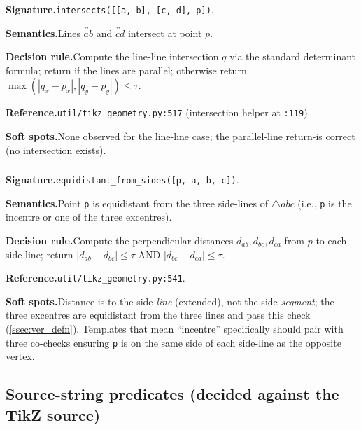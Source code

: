 \subsubsection{}
\label{app:pred:intersects}

\noindent\textbf{Signature.}\quad \texttt{intersects([[a, b], [c, d], p])}.

\noindent\textbf{Semantics.}\quad Lines $\overleftrightarrow{ab}$ and $\overleftrightarrow{cd}$ intersect at point $p$.

\noindent\textbf{Decision rule.}\quad Compute the line-line intersection $q$ via the standard determinant formula; return \false if the lines are parallel; otherwise return $\max(|q_x - p_x|, |q_y - p_y|) \leq \tau$.

\noindent\textbf{Reference.}\quad \texttt{util/tikz\_geometry.py:517} (intersection helper at \texttt{:119}).

\noindent\textbf{Soft spots.}\quad None observed for the line-line case; the parallel-line return-\false is correct (no intersection exists).

\subsubsection{}
\label{app:pred:equidistant_from_sides}

\noindent\textbf{Signature.}\quad \texttt{equidistant\_from\_sides([p, a, b, c])}.

\noindent\textbf{Semantics.}\quad Point \texttt{p} is equidistant from the three side-lines of $\triangle abc$ (i.e., \texttt{p} is the incentre or one of the three excentres).

\noindent\textbf{Decision rule.}\quad Compute the perpendicular distances $d_{ab}, d_{bc}, d_{ca}$ from $p$ to each side-line; return $|d_{ab} - d_{bc}| \leq \tau$ AND $|d_{bc} - d_{ca}| \leq \tau$.

\noindent\textbf{Reference.}\quad \texttt{util/tikz\_geometry.py:541}.

\noindent\textbf{Soft spots.}\quad Distance is to the side-\emph{line} (extended), not the side \emph{segment}; the three excentres are equidistant from the three lines and pass this check (\cref{ssec:ver_defn}).
Templates that mean ``incentre'' specifically should pair with three  co-checks ensuring \texttt{p} is on the same side of each side-line as the opposite vertex.

\subsection{Source-string predicates (decided against the TikZ source)}

